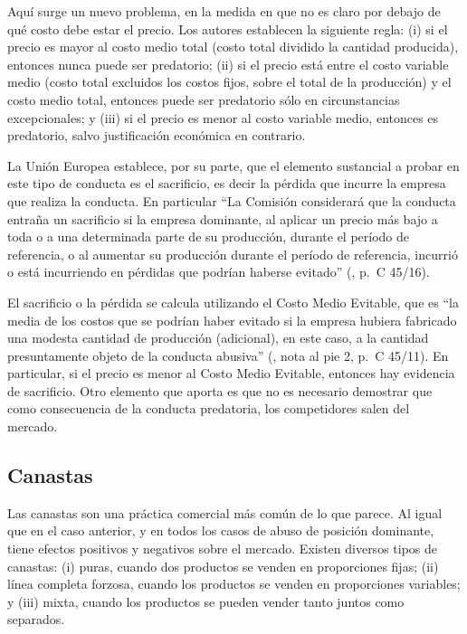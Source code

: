 \documentclass[
  12pt,
  spanish,
]{book}
\begin{document}
Aquí surge un nuevo problema, en la medida en que no es claro por debajo de qué costo debe estar el precio. Los autores establecen la siguiente regla: (i) si el precio es mayor al costo medio total (costo total dividido la cantidad producida), entonces nunca puede ser predatorio; (ii) si el precio está entre el costo variable medio (costo total excluidos los costos fijos, sobre el total de la producción) y el costo medio total, entonces puede ser predatorio sólo en circunstancias excepcionales; y (iii) si el precio es menor al costo variable medio, entonces es predatorio, salvo justificación económica en contrario.

La Unión Europea establece, por su parte, que el elemento sustancial a probar en este tipo de conducta es el sacrificio, es decir la pérdida que incurre la empresa que realiza la conducta. En particular ``La Comisión considerará que la conducta entraña un sacrificio si la empresa dominante, al aplicar un precio más bajo a toda o a una determinada parte de su producción, durante el período de referencia, o al aumentar su producción durante el período de referencia, incurrió o está incurriendo en pérdidas que podrían haberse evitado'' (\citet{UE2009}, p.~C 45/16).

El sacrificio o la pérdida se calcula utilizando el Costo Medio Evitable, que es ``la media de los costos que se podrían haber evitado si la empresa hubiera fabricado una modesta cantidad de producción (adicional), en este caso, a la cantidad presuntamente objeto de la conducta abusiva'' (\citet{UE2009}, nota al pie 2, p.~C 45/11). En particular, si el precio es menor al Costo Medio Evitable, entonces hay evidencia de sacrificio. Otro elemento que aporta es que no es necesario demostrar que como consecuencia de la conducta predatoria, los competidores salen del mercado.

\hypertarget{canastas}{%
\subsection{Canastas}\label{canastas}}

Las canastas son una práctica comercial más común de lo que parece. Al igual que en el caso anterior, y en todos los casos de abuso de posición dominante, tiene efectos positivos y negativos sobre el mercado. Existen diversos tipos de canastas: (i) puras, cuando dos productos se venden en proporciones fijas; (ii) línea completa forzosa, cuando los productos se venden en proporciones variables; y (iii) mixta, cuando los productos se pueden vender tanto juntos como separados.
\end{document}
